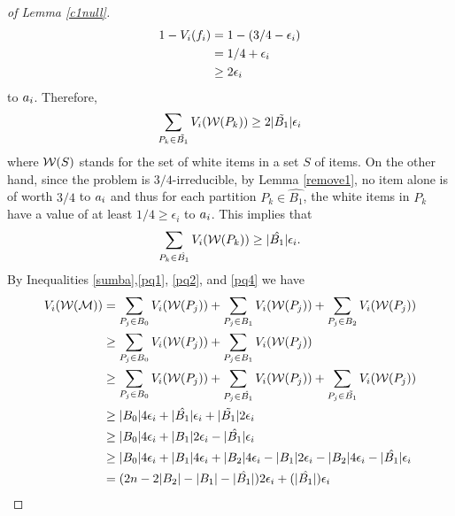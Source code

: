 \begin{proof}[of Lemma \ref{c1null}]
\begin{equation*}
\begin{split}
1- V_i(f_i) &= 1-(3/4-\epsilon_i)\\
&= {1/4}+ \epsilon_i\\
&\geq 2\epsilon_i
\end{split}
\end{equation*}
to $a_i$. Therefore,
\begin{equation}\label{pq2}
\sum_{P_k \in \tilde{B_1}}  V_i(\mathcal{W}(P_k)) \geq 2 |\tilde{B_1}|\epsilon_i
\end{equation}
where $\mathcal{W}(S)$ stands for the set of white items in a set $S$ of items.
 On the other hand, since the problem is $3/4$-irreducible, by Lemma \ref{remove1}, no item alone is of worth $3/4$ to $a_i$ and thus for each partition $P_k \in \hat{B_1}$, the white items in $P_k$ have a value of at least ${1/4} \geq \epsilon_i$ to $a_i$. This implies that
\begin{equation}\label{pq4}
\sum_{P_k \in \hat{B_1}} V_i(\mathcal{W}(P_k)) \geq |\hat{B_1}|  \epsilon_i.
\end{equation}
By Inequalities \eqref{sumba},\eqref{pq1}, \eqref{pq2}, and \eqref{pq4} we have
\begin{equation}\label{enough}
\begin{split}
V_i(\mathcal{W}(\mathcal{M})) &= \sum_{P_j \in B_0} V_i(\mathcal{W}(P_j)) + \sum_{P_j \in B_1} V_i(\mathcal{W}(P_j)) + \sum_{P_j \in B_2} V_i(\mathcal{W}(P_j)) \\
&\geq \sum_{P_j \in B_0} V_i(\mathcal{W}(P_j)) + \sum_{P_j \in B_1} V_i(\mathcal{W}(P_j)) \\
&\geq \sum_{P_j \in B_0} V_i(\mathcal{W}(P_j)) + \sum_{P_j \in \hat{B_1}} V_i(\mathcal{W}(P_j)) + \sum_{P_j \in \tilde{B_1}} V_i(\mathcal{W}(P_j)) \\
&\geq |B_0|  4\epsilon_i + |\hat{B_1}|  \epsilon_i + |\tilde{B_1}|  2\epsilon_i \\
&\geq |B_0|  4\epsilon_i + |B_1| 2\epsilon_i - |\hat{B_1}|  \epsilon_i  \\ 
&\geq |B_0|  4\epsilon_i + |B_1| 4\epsilon_i + |B_2|4\epsilon_i - |B_1| 2\epsilon_i - |B_2|4\epsilon_i- |\hat{B_1}|  \epsilon_i \\
&= (2n-2|B_2| - |B_1| -  |\hat{B_1}|)2\epsilon_i + (|\hat{B_1}|)\epsilon_i
\end{split}
\end{equation}

\end{proof}

